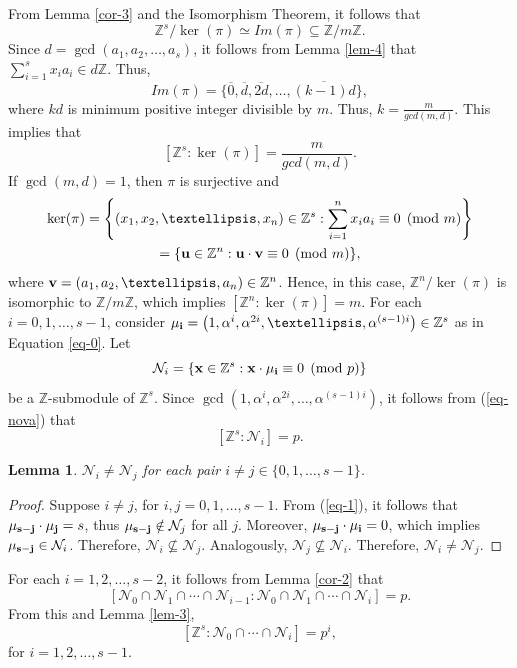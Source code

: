 \documentclass[10pt,a4paper]{amsart}
\newtheorem{lemma}[theorem]{Lemma}
\begin{document}
From Lemma \ref{cor-3} and the Isomorphism Theorem, it follows that \[ \mathbb{Z}^s/\ker(\pi) \simeq Im(\pi)\subseteq \mathbb{Z}/m\mathbb{Z}. \] Since $d=\gcd(a_1,a_2,\ldots,a_s)$, it follows from Lemma \ref{lem-4} that $\sum_{i=1}^s x_ia_i \in d\mathbb{Z}$. Thus, \[ Im(\pi) =\{\overline{0},\overline{d},\overline{2d},\ldots,\overline{(k-1)d}\}, \] where $kd$ is minimum positive integer divisible by $m$. Thus, $k=\frac{m}{gcd(m,d)}$. This implies that \[ [\mathbb{Z}^s:\ker(\pi)] = \frac{m}{gcd(m,d)}. \] If $\gcd(m,d)=1$, then $\pi$ is surjective and
\begin{multline}\label{eq-nova}
   \ker(\pi)=\left\{(x_1,x_2,\ldots,x_n)\in\mathbb{Z}^s:\displaystyle \sum_{i=1}^n x_ia_i\equiv 0 \pmod m\right\}\\
   = \{{\bf u}\in\mathbb{Z}^n:{\bf u}\cdot{\bf v}\equiv 0 \pmod m\},
\end{multline}
where ${\bf v}=(a_1,a_2,\ldots,a_n)\in\mathbb{Z}^n$. Hence, in this case, $\mathbb{Z}^n/\ker(\pi)$ is isomorphic to $\mathbb{Z}/m\mathbb{Z}$, which implies $[\mathbb{Z}^n:\ker(\pi)]=m$.
For each $i=0,1,\ldots,s-1$, consider ${\bf \mu_i}= \left(1,\alpha^i,\alpha^{2i},\ldots,\alpha^{(s-1)i}\right) \in \mathbb{Z}^s$ as in Equation \ref{eq-0}. Let \[ \mathcal{N}_i=\{{\bf x}\in\mathbb{Z}^s: {\bf x}\cdot{\bf \mu_i}\equiv 0 \pmod p\} \] be a $\mathbb{Z}$-submodule of $\mathbb{Z}^s$. Since $\gcd(1,\alpha^i,\alpha^{2i},\ldots,\alpha^{(s-1)i})$, it follows from (\ref{eq-nova}) that $$[\mathbb{Z}^s:\mathcal{N}_i]=p.$$

\begin{lemma} \label{lem-5} $\mathcal{N}_i\neq \mathcal{N}_j$ for each pair $i\neq j\in\{0,1,\ldots,s-1\}$. \end{lemma} \begin{proof} Suppose $i\neq j$, for $i,j=0,1,\ldots,s-1$. From (\ref{eq-1}), it follows that ${\bf \mu_{s-j}}\cdot{\bf \mu_j}=s$, thus ${\bf \mu_{s-j}}\notin \mathcal{N}_j$ for all $j$. Moreover, ${\bf \mu_{s-j}}\cdot{\bf \mu_i}=0$, which implies ${\bf \mu_{s-j}}\in\mathcal{N}_i$. Therefore, $\mathcal{N}_i\not\subseteq \mathcal{N}_j$. Analogously, $\mathcal{N}_j\not\subseteq \mathcal{N}_i$. Therefore, $\mathcal{N}_i\neq \mathcal{N}_j$. \end{proof}

For each $i=1,2,\ldots,s-2$, it follows from Lemma \ref{cor-2} that
\[[\mathcal{N}_0\cap\mathcal{N}_1\cap\cdots\cap\mathcal{N}_{i-1}:\mathcal{N}_0\cap\mathcal{N}_1\cap\cdots\cap\mathcal{N}_{i}]=p.  \]
From this and Lemma \ref{lem-3}, 
\begin{equation}\label{eq-nova2}
   [\mathbb{Z}^s:\mathcal{N}_0\cap\cdots\cap\mathcal{N}_{i}]=p^i,
\end{equation}
for $i=1,2,\ldots,s-1$.
\end{document}
